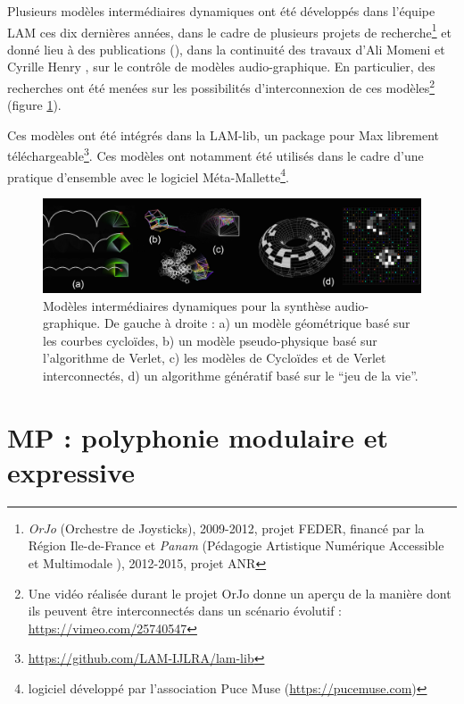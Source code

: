 \noindent Plusieurs modèles intermédiaires dynamiques ont été développés dans l'équipe \gls{LAM} ces dix dernières années, dans le cadre de plusieurs projets de recherche\footnote{\textit{OrJo} (Orchestre de Joysticks), 2009-2012, projet FEDER, financé par la Région Ile-de-France et \textit{Panam} (Pédagogie Artistique Numérique Accessible et Multimodale ), 2012-2015, projet \gls{ANR}} et donné lieu à des publications (\cite{todo}), dans la continuité des travaux d'Ali Momeni et Cyrille Henry \cite{todo}, sur le contrôle de modèles audio-graphique. En particulier, des recherches ont été menées sur les possibilités d'interconnexion de ces modèles\footnote{Une vidéo réalisée durant le projet OrJo donne un aperçu de la manière dont ils peuvent être interconnectés dans un scénario évolutif : \url{https://vimeo.com/25740547}} (figure \ref{fig:algorithms:MP-MID}).

\indent Ces modèles ont été intégrés dans la LAM-lib, un package pour Max librement téléchargeable\footnote{\url{https://github.com/LAM-IJLRA/lam-lib}}. Ces modèles ont notamment été utilisés dans le cadre d'une pratique d'ensemble avec le logiciel Méta-Mallette\footnote{logiciel développé par l'association Puce Muse (\url{https://pucemuse.com})}.


\begin{figure}[!htbp]
	\captionsetup{format=plain}
	\includegraphics[width=\textwidth]{gfx/04_algorithms/OrJo_MID_1200x300px.png}
	\caption[Modèles intermédiaires dynamiques pour la synthèse audio-graphique]{Modèles intermédiaires dynamiques pour la synthèse audio-graphique. De gauche à droite : a) un modèle géométrique basé sur les courbes cycloïdes, b) un modèle pseudo-physique basé sur l'algorithme de Verlet, c) les modèles de Cycloïdes et de Verlet interconnectés, d) un algorithme génératif basé sur le ``jeu de la vie''.}
	\label{fig:algorithms:MP-MID}
\end{figure}


\section{MP : polyphonie modulaire et expressive}
\label{sec:algorithms:MP}


